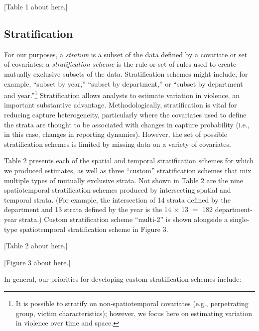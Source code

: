 \documentclass[11pt,]{article}
\let\rmarkdownfootnote\footnote%
\def\footnote{\protect\rmarkdownfootnote}
\begin{document}
{[}Table 1 about here.{]}

\hypertarget{stratification}{%
\subsection{Stratification}\label{stratification}}

For our purposes, a \emph{stratum} is a subset of the data defined by a
covariate or set of covariates; a \emph{stratification scheme} is the
rule or set of rules used to create mutually exclusive subsets of the
data. Stratification schemes might include, for example, ``subset by
year,'' ``subset by department,'' or ``subset by department and
year.''\footnote{It is possible to stratify on non-spatiotemporal
  covariates (e.g., perpetrating group, victim characteristics);
  however, we focus here on estimating variation in violence over time
  and space.} Stratification allows analysts to estimate variation in
violence, an important substantive advantage. Methodologically,
stratification is vital for reducing capture heterogeneity, particularly
where the covariates used to define the strata are thought to be
associated with changes in capture probability (i.e., in this case,
changes in reporting dynamics). However, the set of possible
stratification schemes is limited by missing data on a variety of
covariates.

Table 2 presents each of the spatial and temporal stratification schemes
for which we produced estimates, as well as three ``custom''
stratification schemes that mix multiple types of mutually exclusive
strata. Not shown in Table 2 are the nine spatiotemporal stratification
schemes produced by intersecting spatial and temporal strata. (For
example, the intersection of 14 strata defined by the department and 13
strata defined by the year is the 14 \(\times\) 13 \(=\) 182
department-year strata.) Custom stratification scheme ``multi-2'' is
shown alongside a single-type spatiotemporal stratification scheme in
Figure 3.

{[}Table 2 about here.{]}

{[}Figure 3 about here.{]}

In general, our priorities for developing custom stratification schemes
include:
\end{document}

